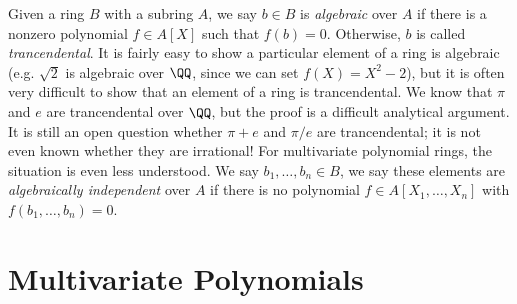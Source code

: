 Given a ring $B$ with a subring $A$, we say $b \in B$ is \emph{algebraic} over $A$ if there is a nonzero polynomial $f \in A[X]$ such that $f(b) = 0$. Otherwise, $b$ is called \emph{trancendental}. It is fairly easy to show a particular element of a ring is algebraic (e.g. $\sqrt{2}$ is algebraic over $\QQ$, since we can set $f(X) = X^2 - 2$), but it is often very difficult to show that an element of a ring is trancendental. We know that $\pi$ and $e$ are trancendental over $\QQ$, but the proof is a difficult analytical argument. It is still an open question whether $\pi + e$ and $\pi/e$ are trancendental; it is not even known whether they are irrational! For multivariate polynomial rings, the situation is even less understood. We say $b_1, \dots, b_n \in B$, we say these elements are {\it algebraically independent} over $A$ if there is no polynomial $f \in A[X_1, \dots, X_n]$ with $f(b_1, \dots, b_n) = 0$.

\section{Multivariate Polynomials}

